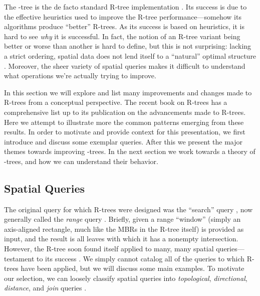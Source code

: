 \newcommand{\keyword}[1]{\textbf{#1}}


The \rstar-tree is the de facto standard R-tree implementation \cite{thebook}.
Its success is due to the effective heuristics used to improve the R-tree performance---somehow its algorithms produce ``better'' R-trees.
As its success is based on heuristics, it is hard to see \emph{why} it is successful.
In fact, the notion of an R-tree variant being better or worse than another is hard to define, but this is not surprising: lacking a strict ordering, spatial data does not lend itself to a ``natural'' optimal structure \cite{gaedegunther98}.
Moreover, the sheer variety of spatial queries makes it difficult to understand what operations we're actually trying to improve.

In this section we will explore and list many improvements and changes made to R-trees from a conceptual perspective.
The recent book on R-trees \cite{thebook} has a comprehensive list up to its publication on the advancements made to R-trees.
Here we attempt to illustrate more the common patterns emerging from these results.
In order to motivate and provide context for this presentation, we first introduce and discuss some exemplar queries.
After this we present the major themes towards improving \rbase-trees.
In the next section we work towards a theory of \rbase-trees, and how we can understand their behavior.

\subsection{Spatial Queries}
The original query for which R-trees were designed was the ``search'' query \cite{guttman84}, now generally called the \emph{range} query \cite{thebook}.
Briefly, given a range ``window'' (simply an axis-aligned rectangle, much like the MBRs in the R-tree itself) is provided as input, and the result is all leaves with which it has a nonempty intersection.
However, the R-tree soon found itself applied to many, many spatial queries---testament to its success \cite{thebook}.
We simply cannot catalog all of the queries to which R-trees have been applied, but we will discuss some main examples.
To motivate our selection, we can loosely classify spatial queries into \emph{topological}, \emph{directional}, \emph{distance}, and \emph{join} queries \cite{thebook,manolopoulos2003r}.

